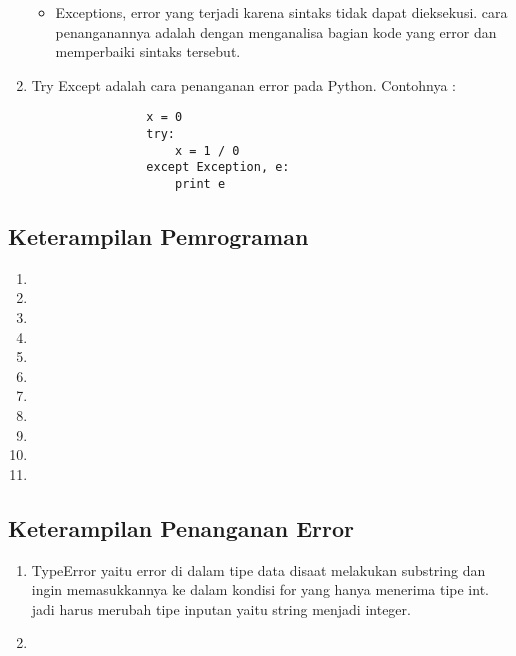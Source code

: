 \begin{enumerate}
\begin{itemize}
					\item Exceptions, error yang terjadi karena sintaks tidak dapat dieksekusi.
					cara penanganannya adalah dengan menganalisa bagian kode yang error dan memperbaiki sintaks tersebut.
				\end{itemize}
			
			\item Try Except adalah cara penanganan error pada Python.
			Contohnya : 
				\begin{verbatim}
				x = 0
				try:
					x = 1 / 0
				except Exception, e:
					print e
				\end{verbatim}

		\end{enumerate}
		
	\subsection{Keterampilan Pemrograman}
		\begin{enumerate}
			\item 

			\item 

			\item 

			\item 

			\item 

			\item 

			\item 

			\item 

			\item 

			\item 
			
			\item 
		\end{enumerate}
		
	\subsection{Keterampilan Penanganan Error}
		\begin{enumerate}
			\item TypeError yaitu error di dalam tipe data disaat melakukan substring dan ingin memasukkannya ke dalam kondisi for 
			yang hanya menerima tipe int. jadi harus merubah tipe inputan yaitu string menjadi integer.

			\item 
		\end{enumerate}

